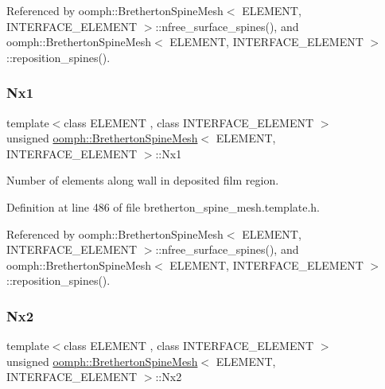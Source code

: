 Referenced by oomph\+::\+Bretherton\+Spine\+Mesh$<$ E\+L\+E\+M\+E\+N\+T, I\+N\+T\+E\+R\+F\+A\+C\+E\+\_\+\+E\+L\+E\+M\+E\+N\+T $>$\+::nfree\+\_\+surface\+\_\+spines(), and oomph\+::\+Bretherton\+Spine\+Mesh$<$ E\+L\+E\+M\+E\+N\+T, I\+N\+T\+E\+R\+F\+A\+C\+E\+\_\+\+E\+L\+E\+M\+E\+N\+T $>$\+::reposition\+\_\+spines().

\mbox{\label{classoomph_1_1BrethertonSpineMesh_af6ef10fb80559c3ad27a50116da60dcc}} 
\subsubsection{\texorpdfstring{Nx1}{Nx1}}
{\footnotesize\ttfamily template$<$class E\+L\+E\+M\+E\+NT , class I\+N\+T\+E\+R\+F\+A\+C\+E\+\_\+\+E\+L\+E\+M\+E\+NT $>$ \\
unsigned \hyperlink{classoomph_1_1BrethertonSpineMesh}{oomph\+::\+Bretherton\+Spine\+Mesh}$<$ E\+L\+E\+M\+E\+NT, I\+N\+T\+E\+R\+F\+A\+C\+E\+\_\+\+E\+L\+E\+M\+E\+NT $>$\+::Nx1\hspace{0.3cm}{\ttfamily [protected]}}



Number of elements along wall in deposited film region. 



Definition at line 486 of file bretherton\+\_\+spine\+\_\+mesh.\+template.\+h.



Referenced by oomph\+::\+Bretherton\+Spine\+Mesh$<$ E\+L\+E\+M\+E\+N\+T, I\+N\+T\+E\+R\+F\+A\+C\+E\+\_\+\+E\+L\+E\+M\+E\+N\+T $>$\+::nfree\+\_\+surface\+\_\+spines(), and oomph\+::\+Bretherton\+Spine\+Mesh$<$ E\+L\+E\+M\+E\+N\+T, I\+N\+T\+E\+R\+F\+A\+C\+E\+\_\+\+E\+L\+E\+M\+E\+N\+T $>$\+::reposition\+\_\+spines().

\mbox{\label{classoomph_1_1BrethertonSpineMesh_a237b4f516eb3f74e42e190f2a23f93c3}} 
\subsubsection{\texorpdfstring{Nx2}{Nx2}}
{\footnotesize\ttfamily template$<$class E\+L\+E\+M\+E\+NT , class I\+N\+T\+E\+R\+F\+A\+C\+E\+\_\+\+E\+L\+E\+M\+E\+NT $>$ \\
unsigned \hyperlink{classoomph_1_1BrethertonSpineMesh}{oomph\+::\+Bretherton\+Spine\+Mesh}$<$ E\+L\+E\+M\+E\+NT, I\+N\+T\+E\+R\+F\+A\+C\+E\+\_\+\+E\+L\+E\+M\+E\+NT $>$\+::Nx2\hspace{0.3cm}{\ttfamily [protected]}}



